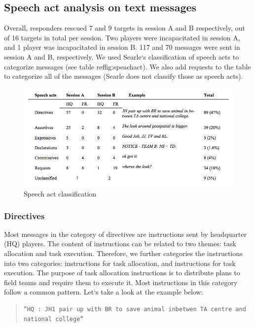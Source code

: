 \subsection{Speech act analysis on text messages}
Overall, responders rescued 7 and 9 targets in session A and B respectively, out of 16 targets in total per session. Two players were incapacitated in session A, and 1 player was incapacitated in session B. 117 and 70 messages were sent in session A and B, respectively. We used Searle`s classification of speech acts to categorize messages (see table ref{fig:speachact}). We also add requests to the table to categorize all of the messages (Searle does not classify those as speech acts).\\

\begin{figure}[h]
  \centering
  \includegraphics[width=1\textwidth]{img/study1/speechact}
  \caption{Speech act classification}
  \label{fig:speachact}
\end{figure}

\subsubsection{Directives}

Most messages in the category of directives are instructions sent by headquarter (HQ) players. The content of instructions can be related to two themes: task allocation and task execution. Therefore, we further categories the instructions into two categories: instructions for task allocation, and instructions for task execution. The purpose of task allocation instructions is to distribute plans to field teams and require them to execute it. Most instructions in this category follow a common pattern. Let`s take a look at the example below:\\

\begin{quote}
\texttt{``HQ : JH1 pair up with BR to save animal inbetwen TA centre and national college''}\\
\end{quote}

